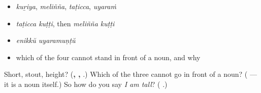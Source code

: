 \begin{itemize}
\raggedright
  \item \emph{kuṟiya}, \emph{meliñña}, \emph{taṭicca}, \emph{uyaraṁ}
  \item \emph{taṭicca kuṭṭi}, then \emph{meliñña kuṭṭi}
  \item \emph{enikkŭ uyaramuṇṭŭ}
  \item which of the four cannot stand in front of a noun, and why
\end{itemize}

\begin{tcolorbox}[breakable,colback=teal!4,colframe=teal!35!black,title={Before you move on}]
Short, stout, height? (\textbf{, , }.) Which of the three cannot go in front of a noun? (\textbf{} — it is a noun itself.) So how do you say \emph{I am tall}? (\textbf{ }.)
\end{tcolorbox}
